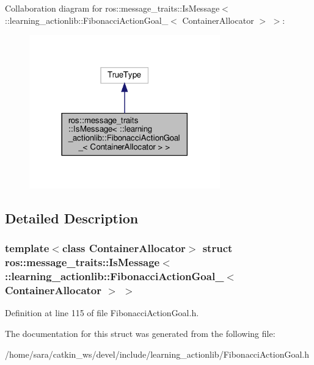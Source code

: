 Collaboration diagram for ros\+:\+:message\+\_\+traits\+:\+:Is\+Message$<$ \+:\+:learning\+\_\+actionlib\+:\+:Fibonacci\+Action\+Goal\+\_\+$<$ Container\+Allocator $>$ $>$\+:
\nopagebreak
\begin{figure}[H]
\begin{center}
\leavevmode
\includegraphics[width=234pt]{structros_1_1message__traits_1_1IsMessage_3_01_1_1learning__actionlib_1_1FibonacciActionGoal___33127630ffc2d7caae981eed77a24b236}
\end{center}
\end{figure}


\subsection{Detailed Description}
\subsubsection*{template$<$class Container\+Allocator$>$\newline
struct ros\+::message\+\_\+traits\+::\+Is\+Message$<$ \+::learning\+\_\+actionlib\+::\+Fibonacci\+Action\+Goal\+\_\+$<$ Container\+Allocator $>$ $>$}



Definition at line 115 of file Fibonacci\+Action\+Goal.\+h.



The documentation for this struct was generated from the following file\+:\begin{DoxyCompactItemize}
\item 
/home/sara/catkin\+\_\+ws/devel/include/learning\+\_\+actionlib/Fibonacci\+Action\+Goal.\+h\end{DoxyCompactItemize}
